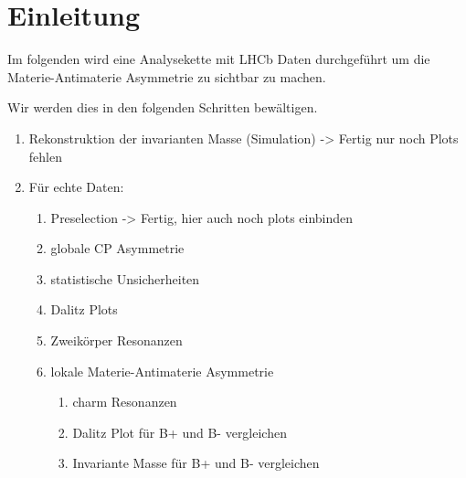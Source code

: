 \section{Einleitung}
\label{sec:einleitung}
Im folgenden wird eine Analysekette mit LHCb Daten durchgef\"uhrt um die Materie-Antimaterie Asymmetrie zu sichtbar zu machen.

Wir werden dies in den folgenden Schritten bew\"altigen.
\begin{enumerate}
  \item Rekonstruktion der invarianten Masse (Simulation) -> Fertig nur noch Plots fehlen
  \item F\"ur echte Daten:
  \begin{enumerate}
    \item Preselection -> Fertig, hier auch noch plots einbinden
    \item globale CP Asymmetrie
    \item statistische Unsicherheiten
    \item Dalitz Plots
    \item Zweik\"orper Resonanzen
    \item lokale Materie-Antimaterie Asymmetrie
    \begin{enumerate}
      \item charm Resonanzen
      \item Dalitz Plot f\"ur B+ und B- vergleichen
      \item Invariante Masse f\"ur B+ und B- vergleichen
    \end{enumerate}
  \end{enumerate}
\end{enumerate}
